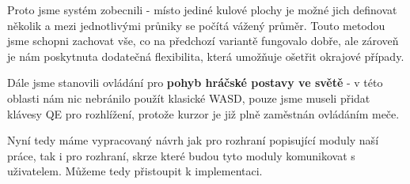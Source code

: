 Proto jsme systém zobecnili - místo jediné kulové plochy je možné jich definovat několik a mezi jednotlivými průniky se počítá vážený průměr. Touto metodou jsme schopni zachovat vše, co na předchozí variantě fungovalo dobře, ale zároveň je nám poskytnuta dodatečná flexibilita, která umožňuje ošetřit okrajové případy.

Dále jsme stanovili ovládání pro \textbf{pohyb hráčské postavy ve světě} - v této oblasti nám nic nebránilo použít klasické WASD, pouze jsme museli přidat klávesy QE pro rozhlížení, protože kurzor je již plně zaměstnán ovládáním meče.

\bigbreak
Nyní tedy máme vypracovaný návrh jak pro rozhraní popisující moduly naší práce, tak i pro rozhraní, skrze které budou tyto moduly komunikovat s uživatelem. Můžeme tedy přistoupit k implementaci.
